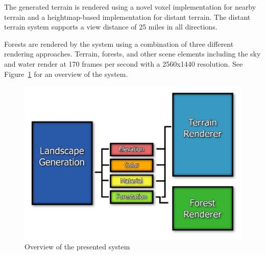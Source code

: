 The generated terrain is rendered using a novel voxel implementation for nearby terrain and a heightmap-based implementation for distant terrain.
The distant terrain system supports a view distance of 25 miles in all directions.

Forests are rendered by the system using a combination of three different rendering approaches.
Terrain, forests, and other scene elements including the sky and water render at 170 frames per second with a 2560x1440 resolution.
See Figure~\ref{fig:system1} for an overview of the system.

\begin{figure}
  \centering
    \includegraphics[width=1.0\textwidth]{figures/SystemOverview.png}
  \caption{Overview of the presented system}
  \label{fig:system1}
\end{figure}

